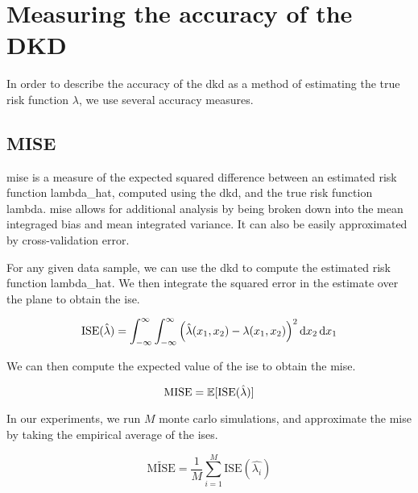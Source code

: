\section{Measuring the accuracy of the DKD}
\label{sec:method:accuracy}

In order to describe the accuracy of the \gls{dkd} as a method of estimating the true risk function \(\lambda\),
we use several accuracy measures.

\subsection{MISE}
\label{subsec:method:mise}

\Gls{mise} is a measure of the expected squared difference between an estimated risk function \gls{lambda_hat},
computed using the \gls{dkd}, and the true risk function \gls{lambda}.
\Gls{mise} allows for additional analysis by being broken down into the mean integraged bias and mean integrated variance.
It can also be easily approximated by cross-validation error.

For any given data sample, we can use the \gls{dkd} to compute the estimated risk function \gls{lambda_hat}.
We then integrate the squared error in the estimate over the plane to obtain the \gls{ise}.

\begin{equation}
\label{eq:ise}
    \mbox{ISE}(\hat{\lambda}) = 
        \int_{-\infty}^{\infty} \int_{-\infty}^{\infty}
            \left(
                \hat{\lambda}(x_1, x_2) - \lambda(x_1, x_2)
            \right)^2 \mathop{}\!\mathrm{d}{x_2} \mathop{}\!\mathrm{d}{x_1}
\end{equation}

We can then compute the expected value of the \gls{ise} to obtain the \gls{mise}.

\begin{equation}
\label{eq:mise}
    \mbox{MISE} = \mathbb{E} [\mbox{ISE}(\hat{\lambda})]
\end{equation}

In our experiments, we run \(M\) monte carlo simulations, and approximate the \gls{mise} by taking the empirical average of the \glspl{ise}.

\begin{equation}
    \widetilde{\mbox{MISE}} = \frac{1}{M} \sum_{i=1}^{M} \mbox{ISE}(\hat{\lambda_i})
\end{equation}


